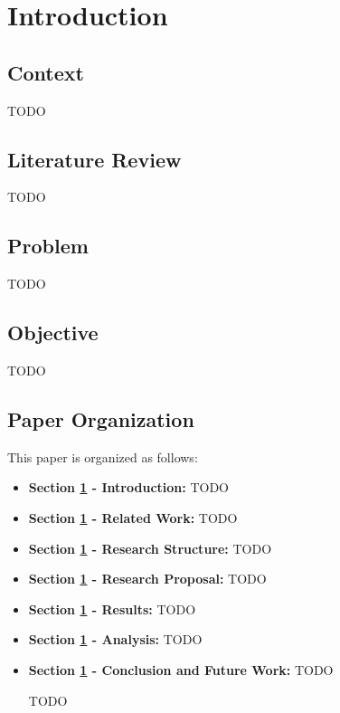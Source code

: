 \chapter{Introduction}        
\label{ch:introducao}

\section{Context}\label{contextualizacao}

TODO

\section{Literature Review}

TODO

\section{Problem}

TODO

\section{Objective}

TODO

\section{Paper Organization}

This paper is organized as follows:

\begin{itemize}

\item \textbf{Section \ref{ch:introducao} - Introduction:} TODO
\item \textbf{Section \ref{ch:introducao} - Related Work:} TODO
\item \textbf{Section \ref{ch:introducao} - Research Structure:} TODO
\item \textbf{Section \ref{ch:introducao} - Research Proposal:} TODO
\item \textbf{Section \ref{ch:introducao} - Results:} TODO
\item \textbf{Section \ref{ch:introducao} - Analysis:} TODO
\item \textbf{Section \ref{ch:introducao} - Conclusion and Future Work:} TODO

TODO 

\end{itemize}

